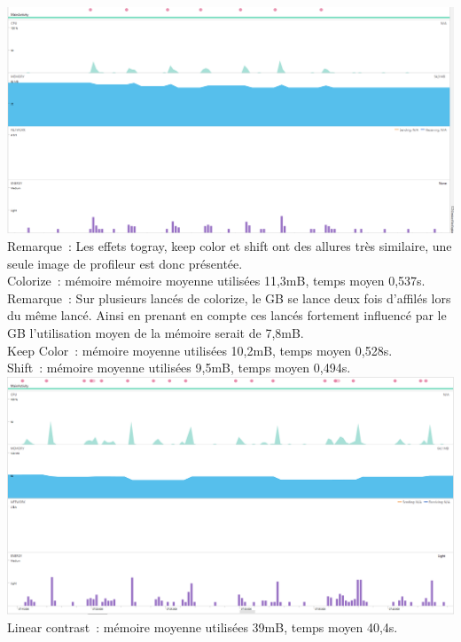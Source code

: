 \documentclass[12pt]{article}
\begin{document}
\includegraphics{1-togray}
    Remarque :
    Les effets togray, keep color et shift ont des allures très similaire, une seule image de profileur est donc présentée.\\


    Colorize : mémoire  mémoire moyenne utilisées 11,3mB, temps moyen 0,537s.\\

    Remarque :
    Sur plusieurs lancés de colorize, le GB se lance deux fois d’affilés lors du même lancé. Ainsi en prenant en compte ces lancés fortement influencé par le GB l’utilisation moyen de la mémoire serait  de 7,8mB.\\

    Keep Color : mémoire moyenne utilisées 10,2mB, temps moyen 0,528s.\\


    Shift : mémoire moyenne utilisées 9,5mB, temps moyen 0,494s.\\




\includegraphics{1-shift}
Linear contrast : mémoire moyenne utilisées 39mB, temps moyen 40,4s.\\
\end{document}
